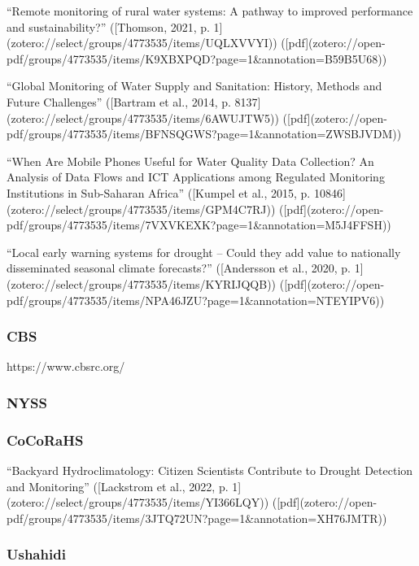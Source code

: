 {“Remote monitoring of rural water systems: A pathway to improved performance and sustainability?” ([Thomson, 2021, p. 1](zotero://select/groups/4773535/items/UQLXVVYI)) ([pdf](zotero://open-pdf/groups/4773535/items/K9XBXPQD?page=1&annotation=B59B5U68))

“Global Monitoring of Water Supply and Sanitation: History, Methods and Future Challenges” ([Bartram et al., 2014, p. 8137](zotero://select/groups/4773535/items/6AWUJTW5)) ([pdf](zotero://open-pdf/groups/4773535/items/BFNSQGWS?page=1&annotation=ZWSBJVDM))

“When Are Mobile Phones Useful for Water Quality Data Collection? An Analysis of Data Flows and ICT Applications among Regulated Monitoring Institutions in Sub-Saharan Africa” ([Kumpel et al., 2015, p. 10846](zotero://select/groups/4773535/items/GPM4C7RJ)) ([pdf](zotero://open-pdf/groups/4773535/items/7VXVKEXK?page=1&annotation=M5J4FFSH))

“Local early warning systems for drought – Could they add value to nationally disseminated seasonal climate forecasts?” ([Andersson et al., 2020, p. 1](zotero://select/groups/4773535/items/KYRIJQQB)) ([pdf](zotero://open-pdf/groups/4773535/items/NPA46JZU?page=1&annotation=NTEYIPV6))

\subsubsection{CBS}
https://www.cbsrc.org/

\subsubsection{NYSS}

\subsubsection{CoCoRaHS}
“Backyard Hydroclimatology: Citizen Scientists Contribute to Drought Detection and Monitoring” ([Lackstrom et al., 2022, p. 1](zotero://select/groups/4773535/items/YI366LQY)) ([pdf](zotero://open-pdf/groups/4773535/items/3JTQ72UN?page=1&annotation=XH76JMTR))

\subsubsection{Ushahidi} %

}

